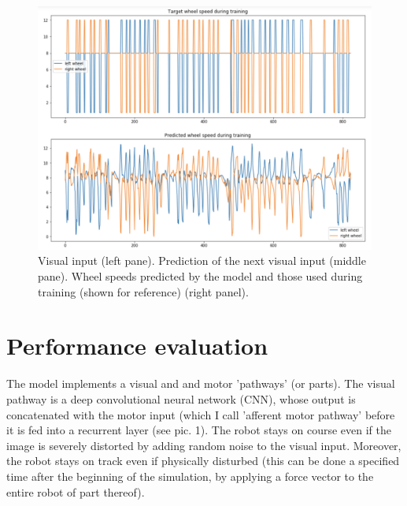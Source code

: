 \documentclass[11pt, oneside]{article}   	%
\begin{document}
\begin{figure}[h]
\includegraphics[width=\columnwidth]{Fig_6} 
\caption{Visual input (left pane). Prediction of the next visual input (middle pane). Wheel speeds predicted by the model and those used during training (shown for reference) (right panel). }
\label{fig:whsp}
\end{figure}

\section{Performance evaluation}
The model implements a visual and and motor 'pathways' (or parts). The visual pathway is a deep convolutional neural network (CNN), whose output is concatenated with the motor input (which I call 'afferent motor pathway' before it is fed into a recurrent layer (see pic. 1). The robot stays on course even if the image is severely distorted by adding random noise to the visual input. Moreover, the robot stays on track even if physically disturbed (this can be done a specified time after the beginning of the simulation, by applying a force vector to the entire robot of part thereof). 
\end{document}
